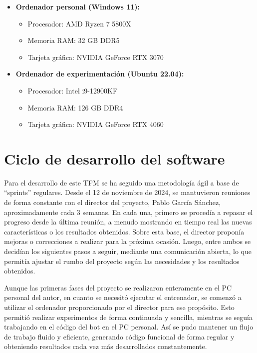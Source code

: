 \begin{itemize}
	\item \textbf{Ordenador personal (Windows 11):}
	      \begin{itemize}
		      \item Procesador: AMD Ryzen 7 5800X
		      \item Memoria RAM: 32 GB DDR5
		      \item Tarjeta gráfica: NVIDIA GeForce RTX 3070
	      \end{itemize}
	\item \textbf{Ordenador de experimentación (Ubuntu 22.04):}
	      \begin{itemize}
		      \item Procesador: Intel i9-12900KF
		      \item Memoria RAM: 126 GB DDR4
		      \item Tarjeta gráfica: NVIDIA GeForce RTX 4060
	      \end{itemize}
\end{itemize}

\section{Ciclo de desarrollo del software} \label{sec:metodologia_desarrollo}

Para el desarrollo de este TFM se ha seguido una metodología ágil a base de ``sprints'' regulares. Desde el 12 de noviembre de 2024, se mantuvieron reuniones de forma constante con el director del proyecto, Pablo García Sánchez, aproximadamente cada 3 semanas. En cada una, primero se procedía a repasar el progreso desde la última reunión, a menudo mostrando en tiempo real las nuevas características o los resultados obtenidos. Sobre esta base, el director proponía mejoras o correcciones a realizar para la próxima ocasión. Luego, entre ambos se decidían los siguientes pasos a seguir, mediante una comunicación abierta, lo que permitía ajustar el rumbo del proyecto según las necesidades y los resultados obtenidos.

Aunque las primeras fases del proyecto se realizaron enteramente en el PC personal del autor, en cuanto se necesitó ejecutar el entrenador, se comenzó a utilizar el ordenador proporcionado por el director para ese propósito. Esto permitió realizar experimentos de forma continuada y sencilla, mientras se seguía trabajando en el código del bot en el PC personal. Así se pudo mantener un flujo de trabajo fluido y eficiente, generando código funcional de forma regular y obteniendo resultados cada vez más desarrollados constantemente.



